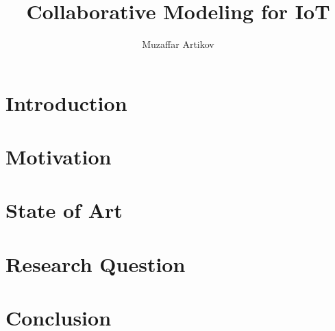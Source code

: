 \documentclass[10pt, oneside]{article}
\title{Collaborative Modeling for IoT}
\author{Muzaffar Artikov}
\date{}
\begin{document}
\maketitle

\section{Introduction}

\section{Motivation}

\section{State of Art}

\section{Research Question}

\section{Conclusion}




\end{document}
